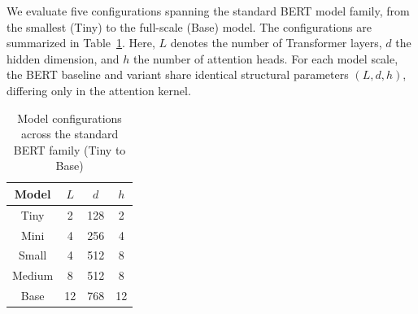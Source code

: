 \documentclass[sigconf,anonymous,review,balance=false]{acmart}
\begin{document}
We evaluate five configurations spanning the standard BERT model family, from the smallest (Tiny) to the full-scale (Base) model. The configurations are summarized in Table~\ref{tab:model_configs}. Here, $L$ denotes the number of Transformer layers, $d$ the hidden dimension, and $h$ the number of attention heads. For each model scale, the BERT baseline and \nystromformer variant share identical structural parameters $(L, d, h)$, differing only in the attention kernel.
\begin{table}[h]
    \centering
    \begin{tabular}{c c c c}
    \hline
    Model & $L$ & $d$ & $h$ \\
    \hline
    Tiny   & 2  & 128 & 2 \\
    Mini   & 4  & 256 & 4 \\
    Small  & 4  & 512 & 8 \\
    Medium & 8  & 512 & 8 \\
    Base   & 12 & 768 & 12 \\
    \hline
    \end{tabular}
    \caption{Model configurations across the standard BERT family (Tiny to Base)}
    \label{tab:model_configs}
\end{table}


\end{document}
